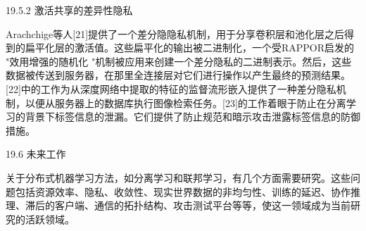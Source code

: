 19.5.2 激活共享的差异性隐私

Arachchige等人[21]提供了一个差分隐隐私机制，用于分享卷积层和池化层之后得到的扁平化层的激活值。这些扁平化的输出被二进制化，一个受RAPPOR启发的 "效用增强的随机化 "机制被应用来创建一个差分隐私的二进制表示。然后，这些数据被传送到服务器，在那里全连接层对它们进行操作以产生最终的预测结果。[22]中的工作为从深度网络中提取的特征的监督流形嵌入提供了一种差分隐私机制，以便从服务器上的数据库执行图像检索任务。[23]的工作着眼于防止在分离学习的背景下标签信息的泄漏。它们提供了防止规范和暗示攻击泄露标签信息的防御措施。

 19.6 未来工作

关于分布式机器学习方法，如分离学习和联邦学习，有几个方面需要研究。这些问题包括资源效率、隐私、收敛性、现实世界数据的非均匀性、训练的延迟、协作推理、滞后的客户端、通信的拓扑结构、攻击测试平台等等，使这一领域成为当前研究的活跃领域。
